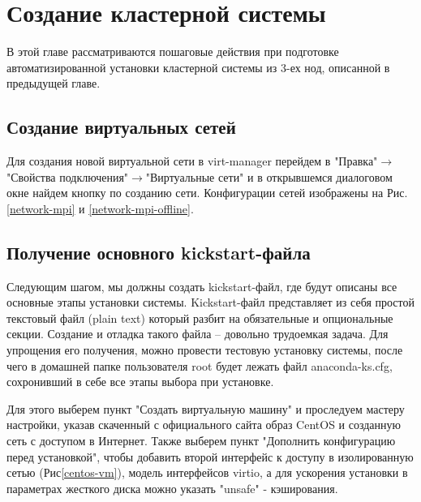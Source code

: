 \chapter{Создание кластерной системы}

В этой главе рассматриваются пошаговые действия при подготовке
автоматизированной установки кластерной системы из 3-ех нод,
описанной в предыдущей главе.

\section{Создание виртуальных сетей}

Для создания новой виртуальной сети в \textmd{virt-manager}
перейдем в "Правка"$\rightarrow$"Свойства подключения"$\rightarrow$"Виртуальные сети"
и в открывшемся диалоговом окне найдем кнопку по созданию сети.
Конфигурации сетей изображены на Рис. \ref{network-mpi} и
\ref{network-mpi-offline}.


\clearpage

\section{Получение основного kickstart-файла}

Следующим шагом, мы должны создать kickstart-файл, где будут
описаны все основные этапы установки системы. Kickstart-файл
представляет из себя простой текстовый файл (plain text)
который разбит на обязательные и опциональные секции. Создание
и отладка такого файла -- довольно трудоемкая задача. Для
упрощения его получения, можно провести тестовую установку
системы, после чего в домашней папке пользователя \textmd{root}
будет лежать файл \textmd{anaconda-ks.cfg}, сохронивший в
себе все этапы выбора при установке.


Для этого выберем пункт "Создать виртуальную машину" и
проследуем мастеру настройки, указав скаченный с официального сайта
образ CentOS и созданную сеть с доступом в Интернет. Также выберем пункт
"Дополнить конфигурацию перед установкой", чтобы добавить
второй интерфейс к доступу в изолированную сетью (Рис\ref{centos-vm}),
модель интерфейсов \textmd{virtio}, а для ускорения установки
в параметрах жесткого диска можно указать "unsafe" - кэширования.
\clearpage

